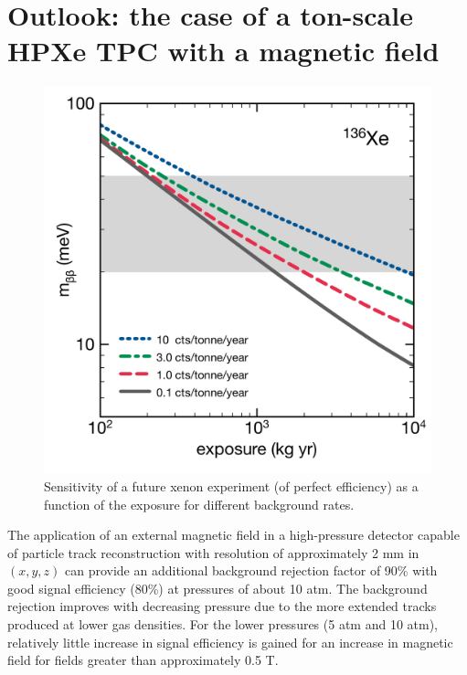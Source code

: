\documentclass{JINST}
\begin{document}
\section{Outlook: the case of a ton-scale HPXe TPC with a magnetic field}\label{sec.outlook}

\begin{figure}[!htb]
\centering
	\includegraphics[scale=0.5]{img/FutureXe136.pdf}
	\caption{\label{fig_futureXe} Sensitivity of a future xenon experiment (of perfect efficiency) as a function
	of the exposure for different background rates.}
\end{figure}

The application of an external magnetic field in a high-pressure detector capable of particle track reconstruction with resolution of approximately 2 mm in $(x,y,z)$ can provide an additional background rejection factor of 90\% with good signal efficiency (80\%) at pressures of about 10 atm.  The background rejection improves with decreasing pressure due to the more extended tracks produced at lower gas densities.  For the lower pressures (5 atm and 10 atm), relatively little increase in signal efficiency is gained for an increase in magnetic field for fields greater than approximately 0.5 T. 
\end{document}
